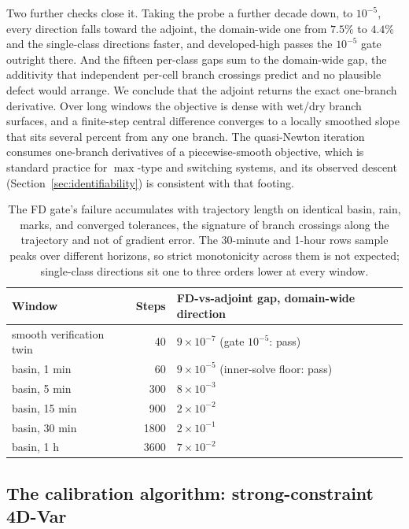 \documentclass[11pt]{article}
\begin{document}
Two further checks close it. Taking the
probe a further decade down, to $10^{-5}$, every direction falls
toward the adjoint, the domain-wide one from $7.5\%$ to $4.4\%$ and
the single-class directions faster, and developed-high passes the
$10^{-5}$ gate outright there. And the fifteen
per-class gaps sum to the domain-wide gap, the additivity that
independent per-cell branch crossings predict and no plausible defect
would arrange. We conclude that the adjoint returns the exact
one-branch derivative. Over long windows the objective is dense with
wet/dry branch surfaces, and a finite-step central difference
converges to a locally smoothed slope that sits several percent from
any one branch. The quasi-Newton iteration consumes one-branch
derivatives of a piecewise-smooth objective, which is standard
practice for $\max$-type and switching systems, and its observed
descent (Section~\ref{sec:identifiability}) is consistent with that
footing.

\begin{table}
\centering\small
\begin{tabular}{@{}lrl@{}}
\toprule
Window & Steps & FD-vs-adjoint gap, domain-wide direction \\
\midrule
smooth verification twin & 40 & $9\times10^{-7}$ (gate $10^{-5}$: pass) \\
basin, 1 min & 60 & $9\times10^{-5}$ (inner-solve floor: pass) \\
basin, 5 min & 300 & $8\times10^{-3}$ \\
basin, 15 min & 900 & $2\times10^{-2}$ \\
basin, 30 min & 1800 & $2\times10^{-1}$ \\
basin, 1 h & 3600 & $7\times10^{-2}$ \\
\bottomrule
\end{tabular}
\caption{The FD gate's failure accumulates with trajectory length on
identical basin, rain, marks, and converged tolerances, the signature
of branch crossings along the trajectory and not of gradient error.
The 30-minute and 1-hour rows sample peaks over different horizons,
so strict monotonicity across them is not expected; single-class
directions sit one to three orders lower at every window.}
\label{tab:fdwindow}
\end{table}

\subsection{The calibration algorithm: strong-constraint 4D-Var}
\label{sec:calibration}
\end{document}
